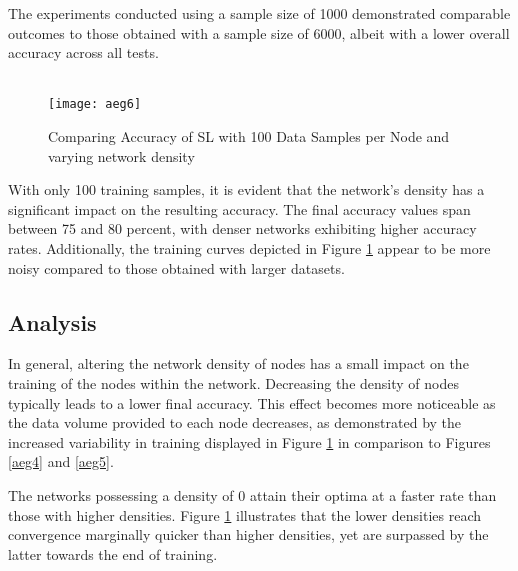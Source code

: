 The experiments conducted using a sample size of 1000 demonstrated comparable outcomes to those obtained with a sample size of 6000, albeit with a lower overall accuracy across all tests.

\begin{figure}[H]
	 \\
	\texttt{[image: aeg6]}
	\caption{Comparing Accuracy of SL with 100 Data Samples per Node and varying network density}
	\label{aeg6}
\end{figure}

With only 100 training samples, it is evident that the network's density has a significant impact on the resulting accuracy. The final accuracy values span between 75 and 80 percent, with denser networks exhibiting higher accuracy rates. Additionally, the training curves depicted in Figure \ref{aeg6} appear to be more noisy compared to those obtained with larger datasets.

\subsection{Analysis}
In general, altering the network density of nodes has a small impact on the training of the nodes within the network. Decreasing the density of nodes typically leads to a lower final accuracy. This effect becomes more noticeable as the data volume provided to each node decreases, as demonstrated by the increased variability in training displayed in Figure \ref{aeg6} in comparison to Figures \ref{aeg4} and \ref{aeg5}.

The networks possessing a density of 0 attain their optima at a faster rate than those with higher densities. Figure \ref{aeg6} illustrates that the lower densities reach convergence marginally quicker than higher densities, yet are surpassed by the latter towards the end of training.